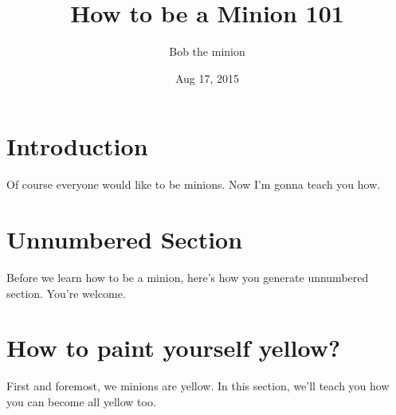 \documentclass{article}
\title{How to be a Minion 101}
\author{Bob the minion}
\date{Aug 17, 2015}
\begin{document}
 
\maketitle
 
\tableofcontents
 
\section{Introduction}
Of course everyone would like to be minions. Now I'm gonna teach you how.
 
 
\section*{Unnumbered Section}
Before we learn how to be a minion, here's how you generate unnumbered section. You're welcome.
 
\section{How to paint yourself yellow?}
First and foremost, we minions are yellow. In this section, we'll teach you how you can become all yellow too.


 
\end{document}
